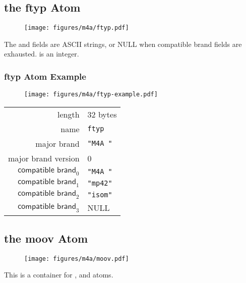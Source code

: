 \subsection{the ftyp Atom}
\begin{figure}[h]
  \texttt{[image: figures/m4a/ftyp.pdf]}
\end{figure}
\par
\noindent
The  and  fields are ASCII strings,
or NULL when compatible brand fields are exhausted.
 is an integer.

\subsubsection{ftyp Atom Example}
\begin{figure}[h]
  \texttt{[image: figures/m4a/ftyp-example.pdf]}
\end{figure}
\par
\noindent
\begin{tabular}{rl}
  \textsf{length} & 32 bytes \\
  \textsf{name} & \texttt{ftyp} \\
  \textsf{major brand} & \texttt{"M4A "} \\
  \textsf{major brand version} & 0 \\
  $\textsf{compatible brand}_0$ & \texttt{"M4A "} \\
  $\textsf{compatible brand}_1$ & \texttt{"mp42"} \\
  $\textsf{compatible brand}_2$ & \texttt{"isom"} \\
  $\textsf{compatible brand}_3$ & NULL \\
\end{tabular}

\clearpage

\subsection{the moov Atom}
\begin{figure}[h]
  \texttt{[image: figures/m4a/moov.pdf]}
\end{figure}
\par
\noindent
This is a container for ,  and  atoms.

\clearpage

